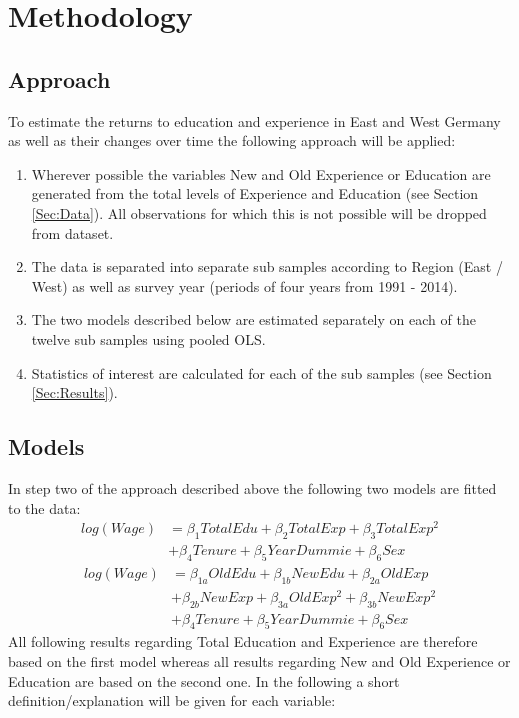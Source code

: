 \section{Methodology}\label{Sec:Method}
\subsection{Approach}
To estimate the returns to education and experience in East and West Germany as well as their changes over time the following approach will be applied:
\begin{enumerate}
	\item Wherever possible the variables New and Old Experience or Education are generated from the total levels of Experience and Education (see Section \ref{Sec:Data}). All observations for which this is not possible will be dropped from dataset.
	\item The data is separated into separate sub samples according to Region (East / West) as well as survey year (periods of four years from 1991 - 2014).
	\item The two models described below are estimated separately on each of the twelve  sub samples using pooled OLS.
	\item Statistics of interest are calculated for each of the sub samples (see Section \ref{Sec:Results}).	
\end{enumerate}

  
\subsection{Models}
In step two of the approach described above the following two models are fitted to the data:
\begin{equation}
	\begin{split}
	log(Wage) &= \beta_{1}TotalEdu + \beta_{2}TotalExp + \beta_{3} TotalExp^2\\
	&+\beta_{4}Tenure + \beta_{5}YearDummie + \beta_{6}Sex
	\end{split}
\end{equation}
\begin{equation} 
	\begin{split}
	log(Wage) &= \beta_{1a}OldEdu + \beta_{1b}NewEdu + \beta_{2a}OldExp \\
	&+ \beta_{2b}NewExp + \beta_{3a}OldExp^2 + \beta_{3b}NewExp^2\\
	&+\beta_{4}Tenure + \beta_{5}YearDummie + \beta_{6}Sex
	\end{split}
\end{equation}
All following results regarding Total Education and Experience are therefore based on the first model whereas all results regarding New and Old Experience or Education are based on the second one.
In the following a short definition/explanation will be given for each variable:

